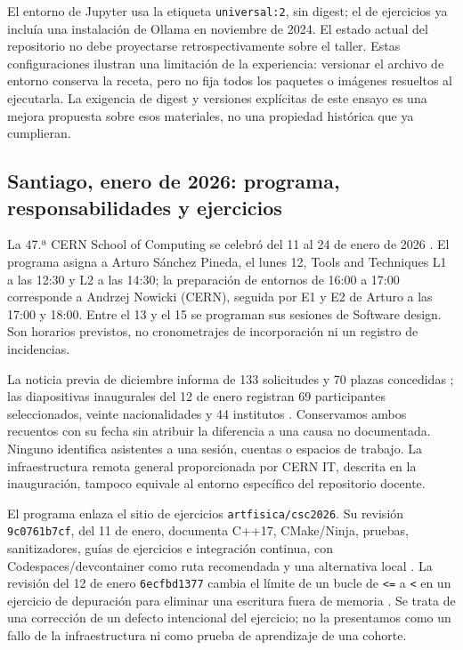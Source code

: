 El entorno de Jupyter usa la etiqueta \texttt{universal:2}, sin digest; el de ejercicios ya incluía una instalación de Ollama en noviembre de 2024. El estado actual del repositorio no debe proyectarse retrospectivamente sobre el taller. Estas configuraciones ilustran una limitación de la experiencia: versionar el archivo de entorno conserva la receta, pero no fija todos los paquetes o imágenes resueltos al ejecutarla. La exigencia de digest y versiones explícitas de este ensayo es una mejora propuesta sobre esos materiales, no una propiedad histórica que ya cumplieran.

\subsection{Santiago, enero de 2026: programa, responsabilidades y ejercicios}
La 47.ª CERN School of Computing se celebró del 11 al 24 de enero de 2026 \cite{csc}. El programa asigna a Arturo Sánchez Pineda, el lunes 12, Tools and Techniques L1 a las 12:30 y L2 a las 14:30; la preparación de entornos de 16:00 a 17:00 corresponde a Andrzej Nowicki (CERN), seguida por E1 y E2 de Arturo a las 17:00 y 18:00. Entre el 13 y el 15 se programan sus sesiones de Software design. Son horarios previstos, no cronometrajes de incorporación ni un registro de incidencias.

La noticia previa de diciembre informa de 133 solicitudes y 70 plazas concedidas \cite{cscadmissions}; las diapositivas inaugurales del 12 de enero registran 69 participantes seleccionados, veinte nacionalidades y 44 institutos \cite{cscopening}. Conservamos ambos recuentos con su fecha sin atribuir la diferencia a una causa no documentada. Ninguno identifica asistentes a una sesión, cuentas o espacios de trabajo. La infraestructura remota general proporcionada por CERN IT, descrita en la inauguración, tampoco equivale al entorno específico del repositorio docente.

El programa enlaza el sitio de ejercicios \texttt{artfisica/csc2026}. Su revisión \texttt{9c0761b7cf}, del 11 de enero, documenta C++17, CMake/Ninja, pruebas, sanitizadores, guías de ejercicios e integración continua, con Codespaces/devcontainer como ruta recomendada y una alternativa local \cite{cscrepo}. La revisión del 12 de enero \texttt{6ecfbd1377} cambia el límite de un bucle de \texttt{<=} a \texttt{<} en un ejercicio de depuración para eliminar una escritura fuera de memoria \cite{cscfix}. Se trata de una corrección de un defecto intencional del ejercicio; no la presentamos como un fallo de la infraestructura ni como prueba de aprendizaje de una cohorte.

